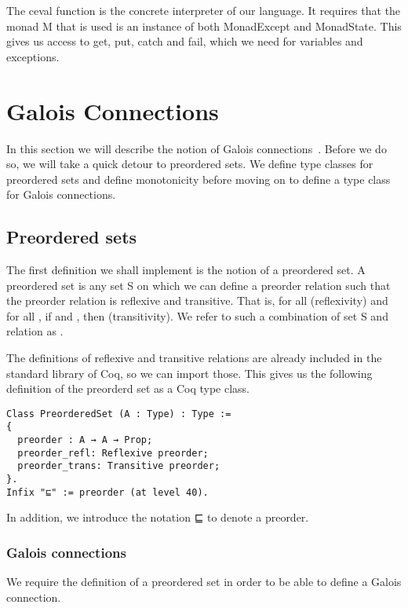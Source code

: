 The ceval function is the concrete interpreter of our language. It requires
that the monad M that is used is an instance of both MonadExcept and
MonadState. This gives us access to get, put, catch and fail, which we need for
variables and exceptions.

\section{Galois Connections}
In this section we will describe the notion of Galois
connections~\cite{cousot1992comparing}. 
Before we do
so, we will take a quick detour to preordered sets. We define type classes for
preordered sets and define monotonicity before moving on to define a type 
class for Galois connections.

\subsection{Preordered sets}
The first definition we shall implement is the notion of a preordered set. 
A preordered set is any set S on which we can define a preorder relation
 such that the preorder relation is reflexive and transitive. That
is, for all  (reflexivity) and for all , if 
 and , then  (transitivity).
We refer to such a combination of set S and relation as .

The definitions of reflexive and transitive relations are already included in
the standard library of Coq, so we can import those. This gives us the
following definition of the preorderd set as a Coq type class.

\begin{listing}
\begin{verbatim}
Class PreorderedSet (A : Type) : Type :=
{
  preorder : A → A → Prop;
  preorder_refl: Reflexive preorder;
  preorder_trans: Transitive preorder;
}.
Infix "⊑" := preorder (at level 40).
\end{verbatim}
\end{listing}

In addition, we introduce the notation ⊑ to denote a preorder.

\subsubsection{Galois connections}
We require the definition of a preordered set in order to be able to define a
Galois connection.

